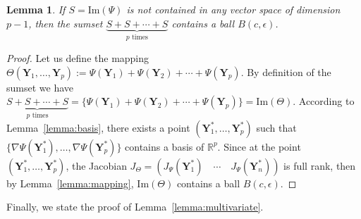 \documentclass[letterpaper,10pt,journal]{IEEEtran}
\newcommand{\Y}{\mathbf{Y}}
\newtheorem{lemma}{Lemma}
\newcommand{\R}{\mathbb R}
\begin{document}
\begin{lemma}\label{lemma:contains_ball}
    If $S=\mathrm{Im}( \Psi)$ is not contained in any vector space of dimension $p-1$, then the sumset $\underbrace{S+S+\cdots+S}_{p \text{ times}}$  contains a ball $B(c,\epsilon)$. 
\end{lemma}
\begin{proof}
    Let us define the mapping $\Theta(\Y_1,\ldots,\Y_p):=\Psi(\Y_1)+\Psi(\Y_2)+\cdots+\Psi(\Y_p)$.
    By definition of the sumset we have $\underbrace{S+S+\cdots+S}_{p \text{ times}}=\{ \Psi(\Y_1)+\Psi(\Y_2)+\cdots+\Psi(\Y_p)\}=\mathrm{Im}(\Theta)$. According to Lemma~\ref{lemma:basis}, there exists a point $(\Y_1^*,\ldots,\Y_p^*)$ such that $\{ \nabla \Psi(\Y_1^*),\ldots,\nabla\Psi(\Y_p^*)\}$ contains a basis of $\R^p$. Since at the point $(\Y_1^*,\ldots,\Y_p^*)$, the Jacobian   $J_ \Theta=(J_ \Psi(\Y_1^*)  \quad \cdots \quad J_ \Psi(\Y_n^*))$ is full rank, then by Lemma~\ref{lemma:mapping}, $\mathrm{Im}(\Theta)$ contains a ball  $B(c,\epsilon)$.  
\end{proof}

Finally, we state the proof of Lemma~\ref{lemma:multivariate}.
\end{document}
